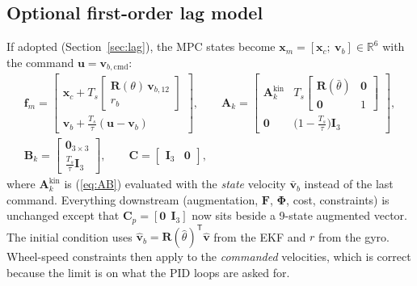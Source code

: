 \documentclass[11pt,a4paper]{article}
\newcommand{\vect}[1]{\bm{#1}}
\newcommand{\mat}[1]{\bm{#1}}
\newcommand{\T}{^{\mathsf{T}}}
\newcommand{\Real}{\mathbb{R}}
\newcommand{\Rot}{\mat{R}}
\newcommand{\Ts}{T_s}
\begin{document}
\subsection{Optional first-order lag model}
\label{sec:lagmodel}
If adopted (Section~\ref{sec:lag}), the MPC states become $\vect x_m=[\vect x_c;\ \vect v_b]\in\Real^6$ with the command $\vect u=\vect v_{b,\mathrm{cmd}}$:
\begin{gather}
\vect f_m = \begin{bmatrix}
\vect x_c + \Ts\begin{bmatrix}\Rot(\theta)\,\vect v_{b,12}\\ r_b\end{bmatrix}\\[6pt]
\vect v_b + \tfrac{\Ts}{\tau}(\vect u-\vect v_b)
\end{bmatrix},
\qquad
\mat A_k = \begin{bmatrix}\mat A_k^{\mathrm{kin}} & \Ts\begin{bmatrix}\Rot(\bar\theta)&\mat 0\\ \mat 0&1\end{bmatrix}\\ \mat 0 & \big(1-\tfrac{\Ts}{\tau}\big)\mat I_3\end{bmatrix},\\
\mat B_k = \begin{bmatrix}\mat 0_{3\times 3}\\ \tfrac{\Ts}{\tau}\mat I_3\end{bmatrix},
\qquad
\mat C = \begin{bmatrix}\mat I_3 & \mat 0\end{bmatrix},
\end{gather}
where $\mat A_k^{\mathrm{kin}}$ is (\ref{eq:AB}) evaluated with the \emph{state} velocity $\bar{\vect v}_b$ instead of the last command. Everything downstream (augmentation, $\mat F$, $\mat\Phi$, cost, constraints) is unchanged except that $\mat C_p=[\mat 0\ \ \mat I_3]$ now sits beside a 9-state augmented vector. The initial condition uses $\hat{\vect v}_b=\Rot(\hat\theta)\T\hat{\vect v}$ from the EKF and $r$ from the gyro. Wheel-speed constraints then apply to the \emph{commanded} velocities, which is correct because the limit is on what the PID loops are asked for.
\end{document}
